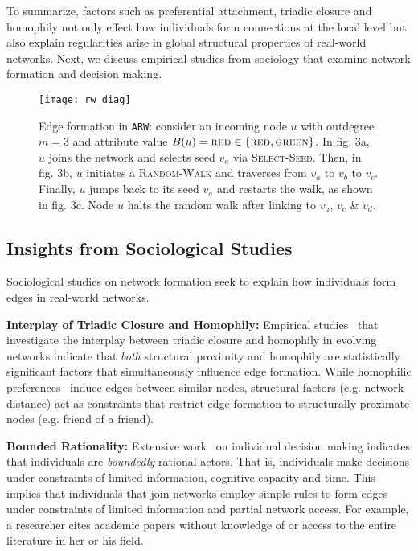
To summarize, factors such as preferential attachment, triadic closure and homophily not only effect how individuals form connections at the local level but also explain regularities arise in global structural properties of real-world networks. Next, we discuss empirical studies from sociology that examine network formation and decision making.

\begin{figure*}[b]
    \centering
    \texttt{[image: rw\_diag]}
    \caption{Edge formation in \texttt{ARW}: consider
    an incoming node $u$ with outdegree ${m=3}$ and attribute value {$B(u)=\textsc{red} \in \{\textsc{red},\textsc{green}\}$}.
    In fig. 3a, $u$ joins the network and selects seed $v_a$ via \textsc{Select-Seed}.
    Then, in fig. 3b, $u$ initiates a \textsc{Random-Walk} and traverses from $v_a$ to $v_b$ to $v_c$.
    Finally, $u$ jumps back to its seed $v_a$ and restarts the walk, as shown in fig. 3c.
    Node $u$ halts the random walk after linking to $v_a$, $v_c$ \& $v_d$.
    }
    \label{fig:randomwalk}
\end{figure*}


\subsection{Insights from Sociological Studies}

Sociological studies on network formation seek to explain
how individuals form edges in real-world networks.

\textbf{Interplay of Triadic Closure and Homophily:} Empirical studies~\cite{35626,block2014multidimensional} that investigate
the interplay between triadic closure and homophily in evolving networks
indicate that \textit{both} structural proximity and homophily are statistically
significant factors that simultaneously influence edge formation. While homophilic preferences~\cite{mcpherson2001birds} induce edges between similar nodes, structural factors (e.g. network distance) act as constraints that restrict edge formation to structurally proximate nodes (e.g. friend of a friend). 

\textbf{Bounded Rationality:} Extensive work~\cite{simon1972theories,gigerenzer1996reasoning,lipman1995information}
on individual decision making indicates that individuals are \textit{boundedly}
rational actors. That is, individuals make decisions under constraints of limited information, cognitive capacity and time. This implies that individuals that join networks employ simple rules to form edges under constraints of limited information and partial network access. For example, a researcher cites academic papers without knowledge of or access
to the entire literature in her or his field.


